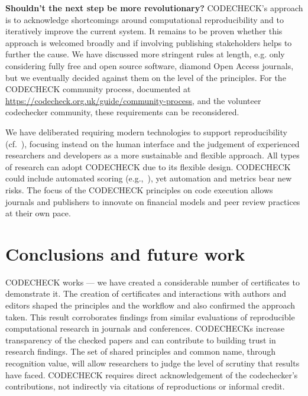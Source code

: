 \documentclass[12pt]{article}
\begin{document}
\textbf{Shouldn't the next step be more revolutionary?}  CODECHECK's
approach is to acknowledge shortcomings around computational
reproducibility and to iteratively improve the current system.  It
remains to be proven whether this approach is welcomed broadly and if
involving publishing stakeholders helps to further the cause.  We have
discussed more stringent rules at length, e.g. only considering fully
free and open source software, diamond Open Access journals, but we
eventually decided against them on the level of the principles.  For
the CODECHECK community
process, documented at
\url{https://codecheck.org.uk/guide/community-process},
and the volunteer codechecker community, these requirements can be 
reconsidered.

We have deliberated requiring modern technologies to support
reproducibility (cf.~\cite{konkol_publishing_2020}), 
focusing instead on the human interface and the judgement of experienced
researchers and developers as a more sustainable and flexible
approach.  All types of research can adopt CODECHECK due to its
flexible design.  CODECHECK could include automated scoring
(e.g.,~\cite{menke_rigor_2020}), yet automation and metrics bear new
risks.  The focus of the CODECHECK principles on code execution allows
journals and publishers to innovate on financial models and peer
review practices at their own pace.

\section*{Conclusions and future work}\label{future-work-and-conclusions}

CODECHECK works --- we have created a considerable number of
certificates to demonstrate it.  The creation of certificates and
interactions with authors and editors shaped the principles and the
workflow and also confirmed the approach taken. This result
corroborates findings from similar evaluations of reproducible
computational research in journals and conferences.  CODECHECKs
increase transparency of the checked papers and can contribute to
building trust in research findings.
The set of shared principles and common name, through recognition
value, will allow researchers to judge the level of scrutiny that
results have faced. CODECHECK requires direct acknowledgement of the
codechecker's contributions, not indirectly via citations of
reproductions or informal credit.
\end{document}
